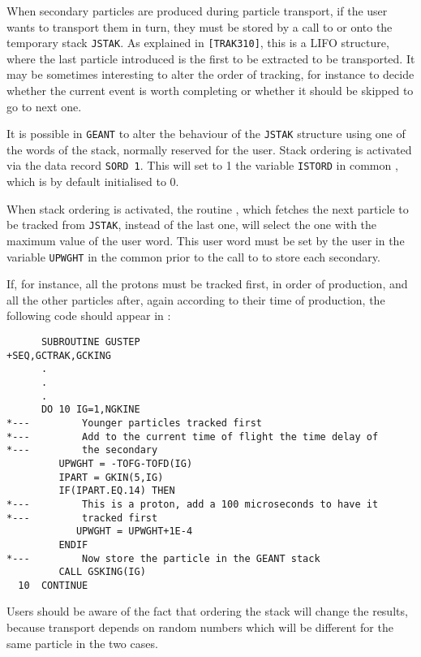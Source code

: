        
       

When secondary particles are produced during particle transport, if
the user wants to transport them in turn, they must be stored by
a call to  or  onto the temporary stack
{\tt JSTAK}. As explained in {\tt [TRAK310]}, this is a LIFO
structure, where the last particle introduced is the first to be extracted
to be transported. It may be sometimes interesting to alter the order
of tracking, for instance to decide whether the current event is
worth completing or whether it should be skipped to go to next one.

It is possible in {\tt GEANT} to alter the behaviour of the {\tt JSTAK}
structure using one of the words of the stack, normally reserved for
the user. Stack ordering is activated via the data record {\tt SORD 1}.
This will set to 1 the variable {\tt ISTORD} in common ,
which is by default initialised to 0.

When stack ordering is activated, the routine , which
fetches the next particle to be tracked from {\tt JSTAK}, instead
of the last one, will select the one with the maximum value of the
user word. This user word must be set by the user in the variable
{\tt UPWGHT} in the common  prior to the call to
 to store each secondary.

If, for instance, all the protons must be tracked first, in order of
production, and all the other particles after, again according to their
time of production, the following code should appear in :

\begin{verbatim}
      SUBROUTINE GUSTEP
+SEQ,GCTRAK,GCKING
      .
      .
      .
      DO 10 IG=1,NGKINE
*---         Younger particles tracked first
*---         Add to the current time of flight the time delay of
*---         the secondary
         UPWGHT = -TOFG-TOFD(IG)
         IPART = GKIN(5,IG)
         IF(IPART.EQ.14) THEN
*---         This is a proton, add a 100 microseconds to have it
*---         tracked first
            UPWGHT = UPWGHT+1E-4
         ENDIF
*---         Now store the particle in the GEANT stack
         CALL GSKING(IG)
  10  CONTINUE
\end{verbatim}

Users should be aware of the fact that ordering the stack will change the
results, because transport depends on random numbers which will be different
for the same particle in the two cases.
